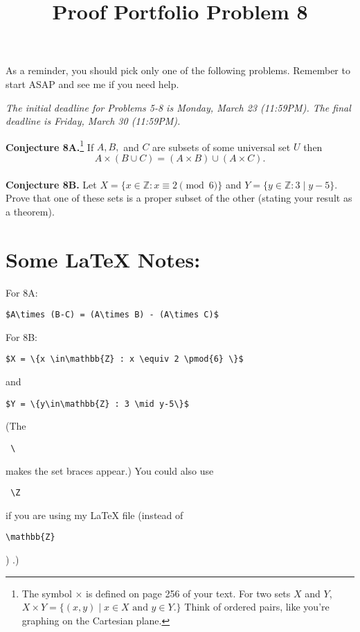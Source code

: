 \documentclass{article}  %
\title{Proof Portfolio Problem 8}
\author{}
\date{}
\newcommand{\Z}{\mathbb{Z}}
\begin{document}
\maketitle

As a reminder, you should pick only one of the following problems. Remember to start ASAP and see me if you need help.

\emph{The initial deadline for Problems 5-8 is Monday, March 23 (11:59PM). The final deadline is Friday, March 30 (11:59PM).}

\noindent\textbf{Conjecture 8A.}\footnote{The symbol $\times$ is defined on page 256 of your text.  For two sets $X$ and $Y$, $X \times Y = \{(x,y) \mid x \in X \text{ and } y\in Y.\}$ Think of ordered pairs, like you're graphing on the Cartesian plane.} If $A,B,$ and $C$ are subsets of some universal set $U$ then
 \[A\times (B\cup C) = (A\times B) \cup(A\times C).\]\\
 


\noindent\textbf{Conjecture 8B.} Let $X = \{x \in\mathbb{Z} : x \equiv 2 \pmod{6} \}$ and $Y = \{y\in\mathbb{Z} : 3 \mid y-5\}$.  Prove that one of these sets is a proper subset of the other (stating your result as a theorem).\\




\section*{Some LaTeX Notes:}
For 8A:
\begin{verbatim}
$A\times (B-C) = (A\times B) - (A\times C)$
\end{verbatim}


\noindent For 8B:  \begin{verbatim}
$X = \{x \in\mathbb{Z} : x \equiv 2 \pmod{6} \}$ \end{verbatim}
and 

\begin{verbatim}$Y = \{y\in\mathbb{Z} : 3 \mid y-5\}$\end{verbatim}
(The \begin{verbatim} \ \end{verbatim} makes the set braces appear.) You could also use \begin{verbatim} \Z \end{verbatim} if you are using my LaTeX file (instead of \begin{verbatim}\mathbb{Z} \end{verbatim}) .)
\end{document}
